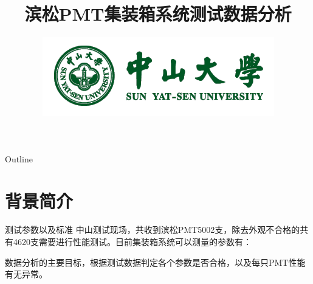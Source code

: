 \documentclass[11pt,compress,xcolor=x11names,UTF8]{beamer}
\title{滨松PMT集装箱系统测试数据分析}
\author[赵荣]{Email：zhaor25@mail2.sysu.edu.cn \and  } %
\institute[中山大学]{School of Physics\and } %
\date[\today]{\includegraphics[width=.5\textwidth]{logo}}
\begin{document}
\maketitle

\begin{frame}{Outline}
\tableofcontents
\end{frame}

\section{背景简介}


\begin{frame}{测试参数以及标准}
中山测试现场，共收到滨松PMT5002支，除去外观不合格的共有4620支需要进行性能测试。目前集装箱系统可以测量的参数有：

\begin{table}[]  
\caption{集装箱测量参数及合格标准}  
\end{table} 
数据分析的主要目标，\alert{根据测试数据判定各个参数是否合格，以及每只PMT性能有无异常。}
\end{frame}
\end{document}
